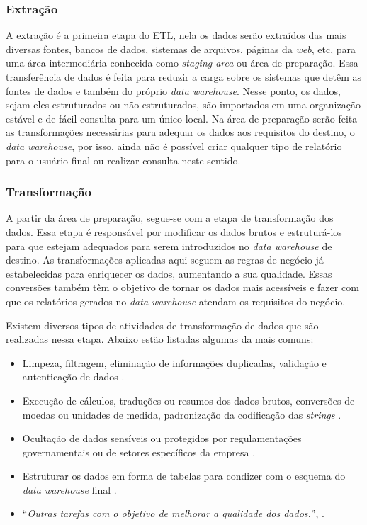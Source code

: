\subsubsection{Extração}
\label{subsec:extracao}
A extração é a primeira etapa do ETL, nela os dados serão extraídos das mais diversas fontes, bancos de dados, sistemas de arquivos, páginas da \textit{web}, etc, para uma área intermediária conhecida como \textit{staging area} ou área de preparação. Essa transferência de dados é feita para reduzir a carga sobre os sistemas que detêm as fontes de dados e também do próprio \textit{data warehouse}. Nesse ponto, os dados, sejam eles estruturados ou não estruturados, são importados em uma organização estável e de fácil consulta para um único local. Na área de preparação serão feita as transformações necessárias para adequar os dados aos requisitos do destino, o \textit{data warehouse}, por isso, ainda não é possível criar qualquer tipo de relatório para o usuário final ou  realizar consulta neste sentido.

\subsubsection{Transformação}
\label{subsec:transformacao}
A partir da área de preparação, segue-se com a etapa de transformação dos dados. Essa etapa é responsável por modificar os dados brutos e estruturá-los para que estejam adequados para serem introduzidos no \textit{data warehouse} de destino. As transformações aplicadas aqui seguem as regras de negócio já estabelecidas para enriquecer os dados, aumentando a sua qualidade. Essas conversões também têm o objetivo de tornar os dados mais acessíveis e fazer com que os relatórios gerados no \textit{data warehouse} atendam os requisitos do negócio.

Existem diversos tipos de atividades de transformação de dados que são realizadas nessa etapa. Abaixo estão listadas algumas da mais comuns:

\begin{itemize}
  \item Limpeza, filtragem, eliminação de informações duplicadas, validação e autenticação de dados \cite{vida2021datawarehouse}.
  \item Execução de cálculos, traduções ou resumos dos dados brutos, conversões de moedas ou unidades de medida, padronização da codificação das \textit{strings} \cite{vida2021datawarehouse}.
  \item Ocultação de dados sensíveis ou protegidos por regulamentações governamentais ou de setores específicos da empresa \cite{vida2021datawarehouse}.
  \item Estruturar os dados em forma de tabelas para condizer com o esquema do \textit{data warehouse} final \cite{vida2021datawarehouse}.
  \item \enquote{\textit{Outras tarefas com o objetivo de melhorar a qualidade dos dados.}}, \cite{vida2021datawarehouse}.
\end{itemize} 

